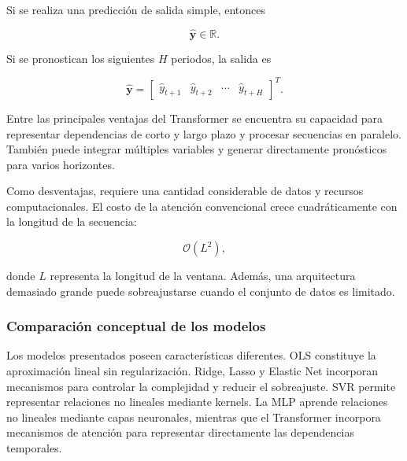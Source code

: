 Si se realiza una predicción de salida simple, entonces

\begin{equation}
    \hat{\mathbf{y}}\in\mathbb{R}.
\end{equation}

Si se pronostican los siguientes $H$ periodos, la salida es

\begin{equation}
    \hat{\mathbf{y}}
    =
    \begin{bmatrix}
        \hat{y}_{t+1} &
        \hat{y}_{t+2} &
        \cdots &
        \hat{y}_{t+H}
    \end{bmatrix}^{T}.
\end{equation}

Entre las principales ventajas del Transformer se encuentra su capacidad para representar dependencias de corto y largo plazo y procesar secuencias en paralelo. También puede integrar múltiples variables y generar directamente pronósticos para varios horizontes.

Como desventajas, requiere una cantidad considerable de datos y recursos computacionales. El costo de la atención convencional crece cuadráticamente con la longitud de la secuencia:

\begin{equation}
    \mathcal{O}(L^2),
\end{equation}

donde $L$ representa la longitud de la ventana. Además, una arquitectura demasiado grande puede sobreajustarse cuando el conjunto de datos es limitado.

\subsubsection{Comparación conceptual de los modelos}
\label{sec:comparacion_modelos}

Los modelos presentados poseen características diferentes. OLS constituye la aproximación lineal sin regularización. Ridge, Lasso y Elastic Net incorporan mecanismos para controlar la complejidad y reducir el sobreajuste. SVR permite representar relaciones no lineales mediante kernels. La MLP aprende relaciones no lineales mediante capas neuronales, mientras que el Transformer incorpora mecanismos de atención para representar directamente las dependencias temporales.

